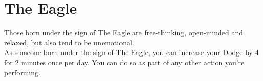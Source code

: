 \section{The Eagle}\label{zodiac:eagle}

Those born under the sign of The Eagle are free-thinking, open-minded and relaxed, but also tend to be unemotional.\\
As someone born under the sign of The Eagle, you can increase your Dodge by 4 for 2 minutes once per day.
You can do so as part of any other action you're performing.\\